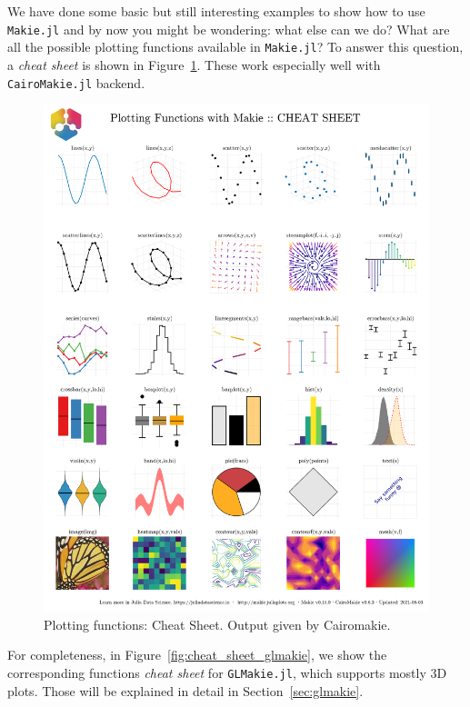 \documentclass[
  notoc %
]{tufte-book}
\newcommand{\passthrough}[1]{#1}
\begin{document}
We have done some basic but still interesting examples to show how to
use \passthrough{\lstinline!Makie.jl!} and by now you might be
wondering: what else can we do? What are all the possible plotting
functions available in \passthrough{\lstinline!Makie.jl!}? To answer
this question, a \emph{cheat sheet} is shown in
Figure~\ref{fig:cheat_sheet_cairomakie}. These work especially well with
\passthrough{\lstinline!CairoMakie.jl!} backend.

\begin{figure}
\hypertarget{fig:cheat_sheet_cairomakie}{%
\centering
\includegraphics{images/makiePlottingFunctionsHide.png}
\caption{Plotting functions: Cheat Sheet. Output given by
Cairomakie.}\label{fig:cheat_sheet_cairomakie}
}
\end{figure}

For completeness, in Figure~\ref{fig:cheat_sheet_glmakie}, we show the
corresponding functions \emph{cheat sheet} for
\passthrough{\lstinline!GLMakie.jl!}, which supports mostly 3D plots.
Those will be explained in detail in Section~\ref{sec:glmakie}.
\end{document}
